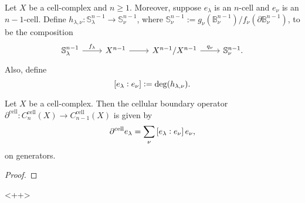 \begin{definition}
	Let $X$ be a cell-complex and $n \geq 1$. Moreover, suppose $e_\lambda$ is an $n$-cell and $e_\nu$ is an $n - 1$-cell. Define $h_{\lambda,\nu} : \mathbb{S}^{n - 1}_\lambda \to \mathbb{S}_\nu^{n - 1}$, where $\mathbb{S}_\nu^{n - 1} := g_\nu(\mathbb{B}^{n - 1}_\nu)/f_\nu(\partial \mathbb{B}^{n - 1}_\nu)$, to be the composition
	\begin{equation*}
		\begin{tikzcd}
			\mathbb{S}_\lambda^{n - 1} \arrow[r,"f_\lambda"] & X^{n - 1} \arrow[r] & X^{n - 1}/X^{n - 1} \arrow[r,"q_\nu"] & \mathbb{S}^{n - 1}_\nu.
		\end{tikzcd}
	\end{equation*}
	Also, define
	\begin{equation*}
		\sbr[0]{e_\lambda : e_\nu} := \deg(h_{\lambda,\nu}).
	\end{equation*}
\end{definition}

\begin{theorem}
	Let $X$ be a cell-complex. Then the cellular boundary operator $\partial^{\mathrm{cell}} : C_n^{\mathrm{cell}}(X) \to C_{n - 1}^{\mathrm{cell}}(X)$ is given by
	\begin{equation*}
		\partial^{\mathrm{cell}}e_\lambda = \sum_\nu \sbr[0]{e_\lambda : e_\nu} e_\nu,
	\end{equation*}
	\noindent on generators.
\end{theorem}

\begin{proof}
	
\end{proof}<++>
